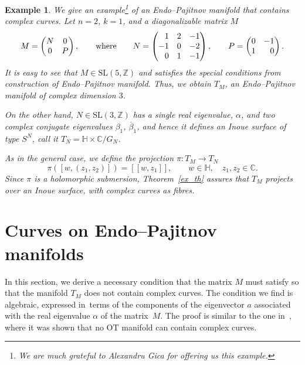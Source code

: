 \documentclass[pdftex]{sigma}
\newcommand{\6}{\partial}
\numberwithin{equation}{section}
\newtheorem{Example}[Theorem]{Example}
\begin{document}
\begin{Example}\label{ex_curves}
We give an example\footnote{We are much grateful to Alexandru Gica for offering us this example.} of an Endo--Pajitnov manifold that contains complex curves.
Let $n=2$, $k=1$, and a diagonalizable matrix $M$
\[
M = \begin{pmatrix}
	N & 0 \\
	0 & P
\end{pmatrix},
\qquad
\text{where}\qquad
N= \begin{pmatrix}
\hphantom{-} 1 & 2 & -1\\
-1 & 0 & -2 \\
\hphantom{-} 0 & 1 & -1
\end{pmatrix}, \qquad
P=\begin{pmatrix}
0 & -1 \\
1 & \hphantom{-} 0
\end{pmatrix}.
\]
It is easy to see that $M \in \textrm{SL}(5, \mathbb{Z})$ and satisfies the special conditions from construction of Endo--Pajitnov manifold.
Thus, we obtain $T_M$, an Endo--Pajitnov manifold of complex dimension $3$.


On the other hand, $N\in \textrm{SL}(3, \mathbb{Z})$ has a single real eigenvalue, $\alpha$, and two complex conjugate eigenvalues $\beta_1$, $\overline{\beta}_1$, and hence it defines an Inoue surface of type $S^N$, call it $T_N=\mathbb{H} \times \mathbb{C}/G_N$.

As in the general case, we define the projection $\pi\colon T_M \longrightarrow T_N$
\[
\pi ([w,(z_1, z_2)])=[[w,z_1]], \qquad w \in \mathbb{H},\quad z_1, z_2 \in \mathbb{C}.
\]
Since $\pi$ is a holomorphic submersion, Theorem~\ref{ex_th} assures that $T_M$ projects over an Inoue surface, with complex curves as fibres.
\end{Example}

\section{Curves on Endo--Pajitnov manifolds}

In this section, we derive a necessary condition that the matrix $M$ must satisfy so that the manifold $T_M$ does not contain complex curves. The condition we find is algebraic, expressed in~terms of the components of the eigenvector $a$ associated with the real eigenvalue $\alpha$ of the matrix~$M$. The proof is similar to the one in~\cite{v_1}, where it was shown that no OT manifold can contain complex curves.
\end{document}

